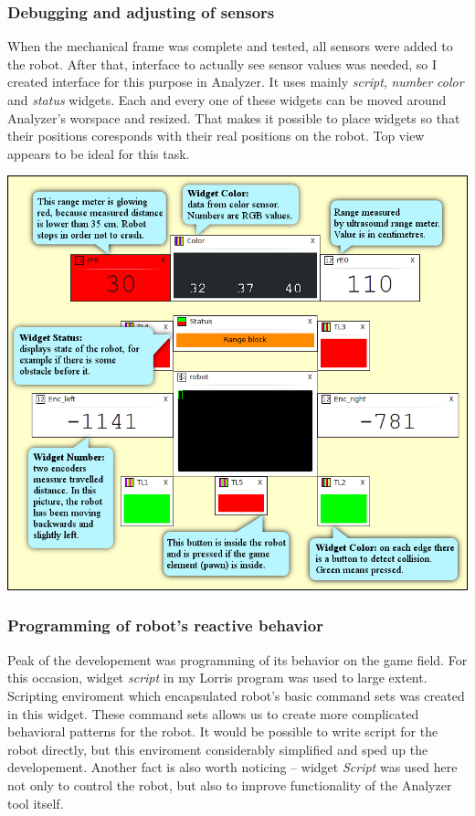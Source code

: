 \documentclass[12pt, a4paper, oneside]{article}
\newcommand{\It}{\textit}  %
\begin{document}
\newpage
\subsubsection{Debugging and adjusting of sensors}
When the mechanical frame was complete and tested, all sensors were added to the robot. After that, interface to actually see sensor values was needed, so I created interface for this purpose in Analyzer. It uses mainly \It{script}, \It{number} \It{color} and \It{status} widgets. Each and every one of these widgets can be moved around Analyzer's worspace and resized. That makes it possible to place widgets so that their positions coresponds with their real positions on the robot. Top view appears to be ideal for this task.
\vspace{10mm}
\begin{center}
\includegraphics[width=\textwidth]{img/sensors_david.png}
\end{center}

\newpage
\subsubsection{Programming of robot's reactive behavior}
Peak of the developement was programming of its behavior on the game field. For this occasion, widget \It{script} in my Lorris program was used to large extent. Scripting enviroment which encapsulated robot's basic command sets was created in this widget. These command sets allows us to create more complicated behavioral patterns for the robot. It would be possible to write script for the robot directly, but this enviroment considerably simplified and sped up the developement. Another fact is also worth noticing -- widget \It{Script} was used here not only to control the robot, but also to improve functionality of the Analyzer tool itself.
\end{document}
